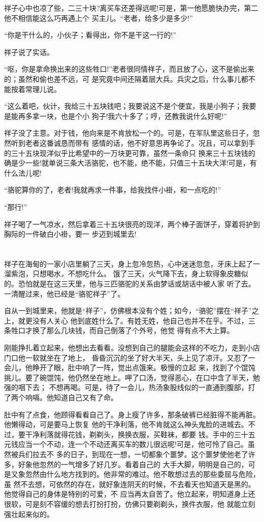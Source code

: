 \documentclass[11pt,a4paper,onecolumn]{article}
\begin{document}
祥子心中也凉了些，二三十块?离买车还差得远呢!可是，第一他愿脆快办完，第二他不相信能这么巧再遇上个
买主儿。``老者，给多少是多少!''

``你是干什么的，小伙子；看得出，你不是干这一行的!''

祥子说了实话。

``呕，你是拿命换出来的这些牲口!''老者很同情祥子，而且放了心，这不是偷出来的；虽然和偷也差不远，可
是究竟中间还隔着层大兵。兵灾之后，什么事儿都不能按着常理儿说。

``这么着吧，伙计，我给三十五块钱吧；我要说这不是个便宜，我是小狗子；我要是能再多拿一块，也是个小
狗子!我六十多了；哼，还教我说什么好呢!''

祥子没了主意。对于钱，他向来是不肯放松一个的。可是，在军队里这些日子，忽然听到老者这番诚恳而带有
感情的话，他不好意思再争论了。况且，可以拿到手的三十五块现洋似乎比希望中的一万块更可靠，虽然一条命只
换来三十五块钱的确是少一些!就单说三条大活骆驼，也不能，绝不能，只值三十五块大洋!可是，有什么法儿呢!

``骆驼算你的了，老者!我就再求一件事，给我找件小褂，和一点吃的!''

``那行!''

祥子喝了一气凉水，然后拿着三十五块很亮的现洋，两个棒子面饼子，穿着将护到胸际的一件破白小褂，要一
步迈到城里去!


\pagebreak
\section{}

祥子在海甸的一家小店里躺了三天，身上忽冷忽热，心中迷迷忽忽，牙床上起了一溜紫泡，只想喝水，不想吃什么。
饿了三天，火气降下去，身上软得象皮糖似的。恐怕就是在这三天里，他与三匹骆驼的关系由梦话或胡话中被人家
听了去。一清醒过来，他已经是``骆驼祥子''了。

自从一到城里来，他就是``祥子''，仿佛根本没有个姓；如今，``骆驼''摆在``祥子''之上，就更没有人关心
他到底姓什么了。有姓无姓，他自己也并不在乎。不过，三条牲口才换了那么几块钱，而自己倒落了个外号，他觉
得有点不大上算。

刚能挣扎着立起来，他想出去看看。没想到自己的腿能会这样的不吃力，走到小店门口他一软就坐在了地上，
昏昏沉沉的坐了好大半天，头上见了凉汗。又忍了一会儿，他睁开了眼，肚中响了一阵，觉出点饿来。极慢的立起
来，找到了个馄饨挑儿。要了碗馄饨，他仍然坐在地上。呷了口汤，觉得恶心，在口中含了半天，勉强的咽下去；
不想再喝。可是，待了一会儿，热汤象股线似的一直通到腹部，打了两个响嗝。他知道自己又有了命。

肚中有了点食，他顾得看看自己了。身上瘦了许多，那条破裤已经脏得不能再脏。他懒得动，可是要马上恢复
他的干净利落，他不肯就这么神头鬼脸的进城去。不过，要干净利落就得花钱，剃剃头，换换衣服，买鞋袜，都要
钱。手中的三十五元钱应当一个不动，连一个不动还离买车的数儿很远呢!可是，他可怜了自己。虽然被兵们拉去不
多的日子，到现在一想，一切都象个噩梦。这个噩梦使他老了许多，好象他忽然的一气增多了好几岁。看着自己的
大手大脚，明明是自己的，可是又象忽然由什么地方找到的。他非常的难过。他不敢想过去的那些委屈与危险，虽
然不去想，可依然的存在，就好象连阴天的时候，不去看天也知道天是黑的。他觉得自己的身体是特别的可爱，不
应当再太自苦了。他立起来，明知道身上还很软，可是刻不容缓的想去打扮打扮，仿佛只要剃剃头，换件衣服，他
就能立刻强壮起来似的。
\end{document}
